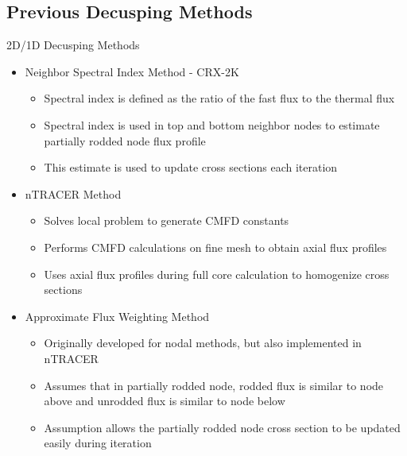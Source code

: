\subsection{Previous Decusping Methods}
\begin{frame}[t]{2D/1D Decusping Methods}

\begin{itemize}
\item Neighbor Spectral Index Method - CRX-2K 
\cite{cho2015CRX2d1dFusionDecusping}
\begin{itemize}
    \item Spectral index is defined as the ratio of the fast flux to the 
    thermal flux
    \item Spectral index is used in top and bottom neighbor nodes to 
    estimate partially rodded node flux profile
    \item This estimate is used to update cross sections 
    each iteration
\end{itemize}
\item nTRACER Method \cite{ICAPPcontrolRodDecuspingNTRACER}
\begin{itemize}
    \item Solves local problem to generate CMFD constants
    \item Performs CMFD calculations on fine mesh to obtain axial flux 
    profiles
    \item Uses axial flux profiles during full core calculation to 
    homogenize cross sections
\end{itemize}
\item Approximate Flux Weighting Method \cite{gehinThesis1992quasi}
\begin{itemize}
    \item Originally developed for nodal methods, but also implemented in nTRACER \cite{Ryu2017nTRACERWholeCoreTransportSolutionstoC5G7-TDBenchmark}
    \item Assumes that in partially rodded node, rodded flux is similar to node above and unrodded flux is similar to node below
    \item Assumption allows the partially rodded node cross section to be updated easily during iteration
\end{itemize}
\end{itemize}

\end{frame}


